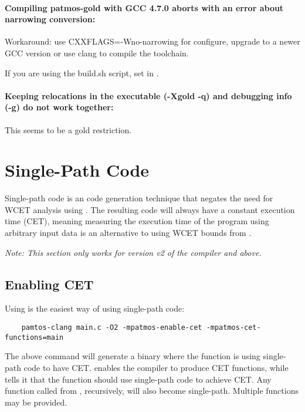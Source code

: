 \paragraph{Compiling patmos-gold with GCC 4.7.0 aborts with an error about narrowing conversion:}
Workaround: use CXXFLAGS=-Wno-narrowing for configure, upgrade to a newer GCC version or
use clang to compile the toolchain.

If you are using the build.sh script, set  in .


\paragraph{Keeping relocations in the executable (-Xgold -q) and debugging info (-g) do not work together:}
This seems to be a gold restriction.

\section{Single-Path Code}

Single-path code is an code generation technique that negates the need for WCET analysis using .
The resulting code will always have a constant execution time (CET), meaning measuring the execution time of the program using arbitrary input data is an alternative to using WCET bounds from .

\textit{Note: This section only works for version v2 of the compiler and above.}

\subsection{Enabling CET}

Using  is the easiest way of using single-path code:

\begin{verbatim}
	pamtos-clang main.c -O2 -mpatmos-enable-cet -mpatmos-cet-functions=main
\end{verbatim}

The above command will generate a binary where the  function is using single-path code to have CET.
 enables the compiler to produce CET functions, while  tells it that the  function should use single-path code to achieve CET.
Any function called from , recursively, will also become single-path.
Multiple functions may be provided.

